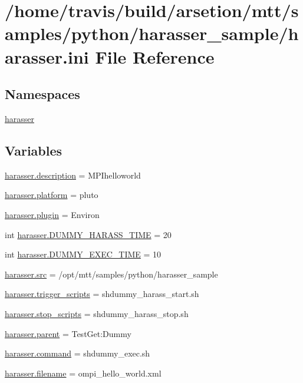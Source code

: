 \hypertarget{harasser_8ini}{\section{/home/travis/build/arsetion/mtt/samples/python/harasser\-\_\-sample/harasser.ini File Reference}
\label{harasser_8ini}
}
\subsection*{Namespaces}
\begin{DoxyCompactItemize}
\item 
\hyperlink{namespaceharasser}{harasser}
\end{DoxyCompactItemize}
\subsection*{Variables}
\begin{DoxyCompactItemize}
\item 
\hyperlink{namespaceharasser_ae9df0d8dd5280b3f68c1594d929d77e9}{harasser.\-description} = M\-P\-Ihelloworld
\item 
\hyperlink{namespaceharasser_aa827937946f071c462edd50adeffbf99}{harasser.\-platform} = pluto
\item 
\hyperlink{namespaceharasser_af41bea3324a7007e30dccbc1526e63b2}{harasser.\-plugin} = Environ
\item 
int \hyperlink{namespaceharasser_a5335f316caefd7dcb9a59e1541f56a10}{harasser.\-D\-U\-M\-M\-Y\-\_\-\-H\-A\-R\-A\-S\-S\-\_\-\-T\-I\-M\-E} = 20
\item 
int \hyperlink{namespaceharasser_a3663429ea3884044eef5813de2c88893}{harasser.\-D\-U\-M\-M\-Y\-\_\-\-E\-X\-E\-C\-\_\-\-T\-I\-M\-E} = 10
\item 
\hyperlink{namespaceharasser_a5cb1fdd5bdc77091984dbf7901fd7e00}{harasser.\-src} = /opt/mtt/samples/python/harasser\-\_\-sample
\item 
\hyperlink{namespaceharasser_aaf0bf1c41f9f803a38db036d20b51461}{harasser.\-trigger\-\_\-scripts} = shdummy\-\_\-harass\-\_\-start.\-sh
\item 
\hyperlink{namespaceharasser_acf2bbc7d9fff08e2232c16a79b0e72f4}{harasser.\-stop\-\_\-scripts} = shdummy\-\_\-harass\-\_\-stop.\-sh
\item 
\hyperlink{namespaceharasser_af9d9d7cb6a6d68880aeec6ccfa16ca23}{harasser.\-parent} = Test\-Get\-:\-Dummy
\item 
\hyperlink{namespaceharasser_a688e3d531b66f0b8013fd72625d9a0b5}{harasser.\-command} = shdummy\-\_\-exec.\-sh
\item 
\hyperlink{namespaceharasser_a8ee1446e84f466e788ff1e2b61666751}{harasser.\-filename} = ompi\-\_\-hello\-\_\-world.\-xml
\end{DoxyCompactItemize}
